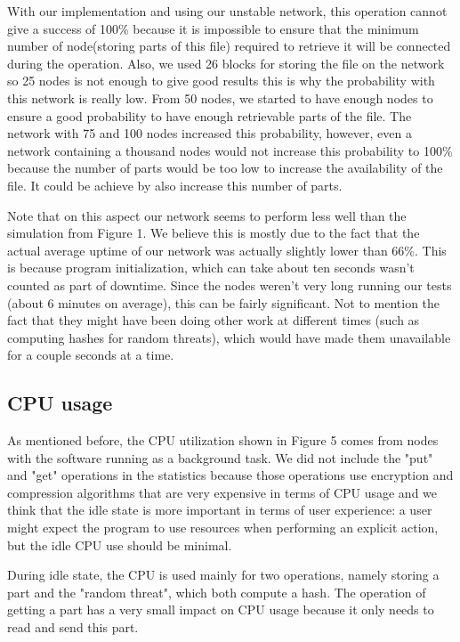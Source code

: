 \documentclass[11pt]{IEEEtran}
\begin{document}
With our implementation and using our unstable network, this operation cannot give a success of 100\% because it is impossible to ensure that the minimum number of node(storing parts of this file) required to retrieve it will be connected during the operation. Also, we used 26 blocks for storing the file on the network so 25 nodes is not enough to give good results this is why the probability with this network is really low. From 50 nodes, we started to have enough nodes to ensure a good probability to have enough retrievable parts of the file. The network with 75 and 100 nodes increased this probability, however, even a network containing a thousand nodes would not increase this probability to 100\% because the number of parts would be too low to increase the availability of the file. It could be achieve by also increase this number of parts. 

Note that on this aspect our network seems to perform less well than the simulation from Figure 1. We believe this is mostly due to the fact that the actual average uptime of our network was actually slightly lower than 66\%. This is because program initialization, which can take about ten seconds wasn't counted as part of downtime. Since the nodes weren't very long running our tests (about 6 minutes on average), this can be fairly significant. Not to mention the fact that they might have been doing other work at different times (such as computing hashes for random threats), which would have made them unavailable for a couple seconds at a time. 

\subsection{CPU usage}

As mentioned before, the CPU utilization shown in Figure 5 comes from nodes with the software running as a background task. We did not include the "put" and "get" operations in the statistics because those operations use encryption and compression algorithms that are very expensive in terms of CPU usage and we think that the idle state is more important in terms of user experience: a user might expect the program to use resources when performing an explicit action, but the idle CPU use should be minimal. 

During idle state, the CPU is used mainly for two operations, namely storing a part and the "random threat", which both compute a hash. The operation of getting a part has a very small impact on CPU usage because it only needs to read and send this part.
\end{document}
